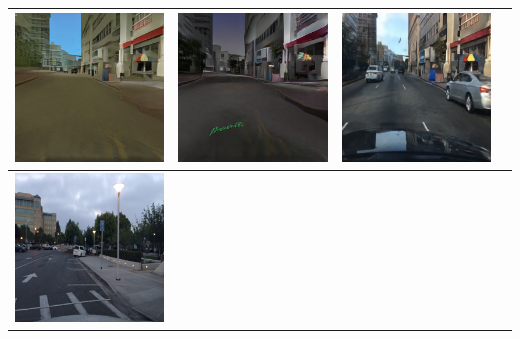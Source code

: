 \documentclass{VUMIFPSkursinis}
\begin{document}
\begin{table}[H]
{\begin{tabular}{|c|c|c|c|}
                \includegraphics[scale=0.35]{img/pvz/6_cycle_v2} & \includegraphics[scale=0.35]{img/pvz/6_cut_v2} & \includegraphics[scale=0.35]{img/pvz/6_mspc_v2}
                \\
                \hline
                \includegraphics[scale=0.35]{img/pvz/7_real} & 

\end{tabular}}
\end{table}
\end{document}
